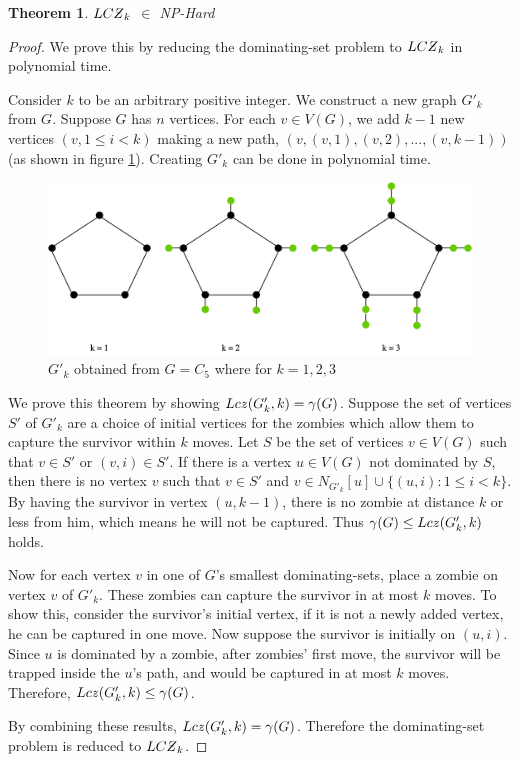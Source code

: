 \documentclass[1p]{elsarticle}
\newtheorem{theorem}{Theorem}
\newcommand{\NPZ}{\ooalign{$Z$\cr\hfil\rule[.8ex]{.3em}{.09ex}\hfil\cr}}
\newcommand{\zn}{\ooalign{$z$\cr\hfil\rule[.5ex]{.2em}{.08ex}\hfil\cr}}
\begin{document}
	\begin{theorem}
		$LC\NPZ_k$ $\in$ NP-Hard
	\end{theorem}
	\begin{proof}
		We prove this by reducing the dominating-set problem to $LC\NPZ_k$ in polynomial time.

		Consider $k$ to be an arbitrary positive integer. We construct a new graph $G'_k$ from $G$. Suppose $G$ has $n$
		vertices. For each $v \in V(G)$, we add $k-1$ new vertices $(v,1 \leq i < k)$ making a new path,
		$(v,(v,1),(v,2),...,(v,k-1))$ (as shown in figure \ref{fig:p7}). Creating $G'_k$ can be done in polynomial time.

		\begin{figure}[h!]
			\centering
			\includegraphics[width=0.9\linewidth]{LCZ.png}
			\caption{$G'_k$ obtained from $G = C_5$ where for $k = 1,2,3$}
			\label{fig:p7}
		\end{figure}		


		We prove this theorem by showing $Lc\zn(G'_k,k) = \gamma(G)$. Suppose the set of vertices $S'$ of $G'_k$ are a
		choice of initial vertices for the zombies which allow them to capture the survivor within $k$ moves. Let $S$ be
		the set of vertices $v \in V(G)$ such that $v \in S'$ or $(v,i) \in S'$. If there is a vertex $u \in V(G)$ not
		dominated by $S$, then there is no vertex $v$ such that $v \in S'$ and $v \in N_{G'_k}[u] \cup \{(u,i): 1 \leq i
		< k\}$. By having the survivor in vertex $(u, k-1)$, there is no zombie at distance $k$ or less from him, which
		means he will not be captured. Thus $\gamma(G) \leq Lc\zn(G'_k,k)$ holds.
		
		Now for each vertex $v$ in one of $G$'s smallest dominating-sets, place a zombie on vertex $v$ of $G'_k$. These
		zombies can capture the survivor in at most $k$ moves. To show this, consider the survivor's initial vertex, if it
		is not a newly added vertex, he can be captured in one move. Now suppose the survivor is initially on $(u,i)$. Since
		$u$ is dominated by a zombie, after zombies' first move, the survivor will be trapped inside the $u$'s path, and would
		be captured in at most $k$ moves. Therefore, $Lc\zn(G'_k,k) \leq \gamma(G)$.

		By combining these results, $Lc\zn(G'_k,k) = \gamma(G)$. Therefore the dominating-set problem is reduced to
		$LC\NPZ_k$.

	\end{proof}
\end{document}
